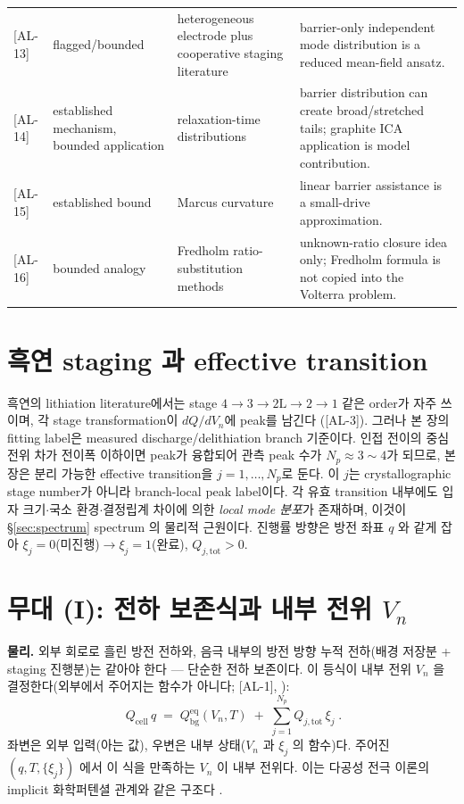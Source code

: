 \documentclass[11pt,a4paper]{article}
\newcommand{\eq}{\mathrm{eq}}
\newcommand{\bg}{\mathrm{bg}}
\newcommand{\cell}{\mathrm{cell}}
\newcommand{\tot}{\mathrm{tot}}
\newcommand{\AL}[1]{\textsf{[AL-#1]}}
\begin{document}
\begin{longtable}{p{} p{} p{} p{}}
\AL{13} & flagged/bounded & heterogeneous electrode plus cooperative staging literature & barrier-only independent mode distribution is a reduced mean-field ansatz. \\
\AL{14} & established mechanism, bounded application & relaxation-time distributions \cite{svare2000,johnston2006,lindsey1980} & barrier distribution can create broad/stretched tails; graphite ICA application is model contribution. \\
\AL{15} & established bound & Marcus curvature \cite{marcus1956} & linear barrier assistance is a small-drive approximation. \\
\AL{16} & bounded analogy & Fredholm ratio-substitution methods \cite{lee2011,son2013,jcp2017} & unknown-ratio closure idea only; Fredholm formula is not copied into the Volterra problem. \\
\bottomrule
\end{longtable}
\section{흑연 staging 과 effective transition}\label{sec:staging}
흑연의 lithiation literature에서는 stage $4\to3\to2\mathrm L\to2\to1$ 같은 order가 자주 쓰이며, 각 stage transformation이 $dQ/dV_n$에 peak를
남긴다 \cite{dahn1991,ohzuku1993,funabiki1999ea,funabiki1999jes}(\AL{3}). 그러나 본 장의 fitting label은 measured discharge/delithiation branch 기준이다.
인접 전이의 중심 전위 차가 전이폭 이하이면 peak가 융합되어 관측 peak 수가 $N_p\approx3\sim4$가 되므로, 본 장은 분리 가능한 effective transition을
$j=1,\dots,N_p$로 둔다. 이 $j$는 crystallographic stage number가 아니라 branch-local peak label이다. 각 유효 transition 내부에도 입자 크기$\cdot$국소 환경$\cdot$결정립계
차이에 의한 \emph{local mode 분포}가 존재하며, 이것이 \S\ref{sec:spectrum} spectrum 의 물리적 근원이다.
진행률 방향은 방전 좌표 $q$ 와 같게 잡아 $\xi_j=0$(미진행)$\to\xi_j=1$(완료), $Q_{j,\tot}>0$.

\section{무대 (I): 전하 보존식과 내부 전위 $V_n$}\label{sec:charge}
\textbf{물리.} 외부 회로로 흘린 방전 전하와, 음극 내부의 방전 방향 누적 전하(배경 저장분 + staging 진행분)는
같아야 한다 — 단순한 전하 보존이다. 이 등식이 내부 전위 $V_n$ 을 결정한다(외부에서 주어지는 함수가
아니다; \AL{1}, \cite{doyle1993,newman}):
\begin{equation}
\boxed{\;Q_\cell\,q \;=\; Q_\bg^{\eq}(V_n,T) \;+\; \sum_{j=1}^{N_p} Q_{j,\tot}\,\xi_j\;.}
\label{eq:charge_balance}
\end{equation}
좌변은 외부 입력(아는 값), 우변은 내부 상태($V_n$ 과 $\xi_j$ 의 함수)다. 주어진 $(q,T,\{\xi_j\})$ 에서 이
식을 만족하는 $V_n$ 이 내부 전위다. 이는 다공성 전극 이론의 implicit 화학퍼텐셜 관계와 같은 구조다
\cite{doyle1993,newman}.
\end{document}
